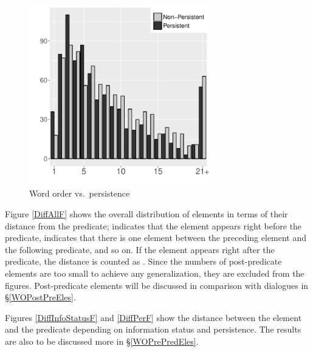 \begin{figure}
	\includegraphics[width=0.7\textwidth]{figure/DEPositionPer.pdf}
	\caption{Word order vs.\ persistence}
	\label{DEPositionPerF}
\end{figure}

Figure \ref{DiffAllF} shows the overall distribution of elements in terms of their distance from the predicate;
 indicates that the element appears right before the predicate,
 indicates that there is one element between the preceding element and the following predicate, and so on.
If the element appears right after the predicate,
the distance is counted as .
Since the numbers of post-predicate elements are too small to achieve any generalization,
they are excluded from the figures.
Post-predicate elements will be discussed in comparison with dialogues
in \S \ref{WOPostPreEles}.

Figures \ref{DiffInfoStatusF} and \ref{DiffPerF} show the distance between the element and the predicate
depending on information status and persistence.
The results are also to be discussed more in \S \ref{WOPrePredEles}.


